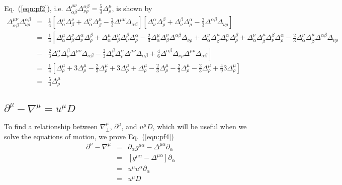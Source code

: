 \documentclass[aps,article]{revtex4}
\begin{document}
Eq.\ (\ref{eqn:pf2}), i.e. $\Delta^{\mu\nu}_{\alpha\beta}\Delta_{\nu\rho}^{\alpha\beta}=\frac{5}{3}\Delta^{\mu}_{\rho}$, is shown by
\begin{eqnarray}
\Delta^{\mu\nu}_{\alpha\beta}\Delta_{\nu\rho}^{\alpha\beta}&=&\frac{1}{4}\left[\Delta_{\alpha}^{\mu}\Delta_{\beta}^{\nu}+\Delta_{\alpha}^{\nu}\Delta_{\beta}^{\mu}-\frac{2}{3}\Delta^{\mu\nu}\Delta_{\alpha\beta}\right]\left[\Delta^{\alpha}_{\nu}\Delta^{\beta}_{\rho}+\Delta^{\beta}_{\nu}\Delta^{\alpha}_{\rho}-\frac{2}{3}\Delta^{\alpha\beta}\Delta_{\nu\rho}\right]\nonumber\\
&=&\frac{1}{4}\left[\Delta_{\alpha}^{\mu}\Delta_{\beta}^{\nu}\Delta^{\alpha}_{\nu}\Delta^{\beta}_{\rho}+\Delta_{\alpha}^{\mu}\Delta_{\beta}^{\nu}\Delta^{\beta}_{\nu}\Delta^{\alpha}_{\rho}-\frac{2}{3}\Delta_{\alpha}^{\mu}\Delta_{\beta}^{\nu}\Delta^{\alpha\beta}\Delta_{\nu\rho}+\Delta_{\alpha}^{\nu}\Delta_{\beta}^{\mu}\Delta^{\alpha}_{\nu}\Delta^{\beta}_{\rho}+\Delta_{\alpha}^{\nu}\Delta_{\beta}^{\mu}\Delta^{\beta}_{\nu}\Delta^{\alpha}_{\rho}-\frac{2}{3}\Delta_{\alpha}^{\nu}\Delta_{\beta}^{\mu}\Delta^{\alpha\beta}\Delta_{\nu\rho}\right.\nonumber\\
&-&\left.\frac{2}{3}\Delta^{\alpha}_{\nu}\Delta^{\beta}_{\rho}\Delta^{\mu\nu}\Delta_{\alpha\beta}-\frac{2}{3}\Delta^{\beta}_{\nu}\Delta^{\alpha}_{\rho}\Delta^{\mu\nu}\Delta_{\alpha\beta}+\frac{4}{6}\Delta^{\alpha\beta}\Delta_{\nu\rho}\Delta^{\mu\nu}\Delta_{\alpha\beta}\right]\nonumber\\
&=&\frac{1}{4}\left[\Delta^{\mu}_{\rho}+3\Delta^{\mu}_{\rho}-\frac{2}{3}\Delta^{\mu}_{\rho}+3\Delta^{\mu}_{\rho}+\Delta^{\mu}_{\rho}-\frac{2}{3}\Delta_{\rho}^{\mu}-\frac{2}{3}\Delta^{\mu}_{\rho}-\frac{2}{3}\Delta^{\mu}_{\rho}+\frac{4}{9}3\Delta_{\rho}^{\mu}\right]\nonumber\\
&=&\frac{5}{3}\Delta_{\rho}^{\mu}
\end{eqnarray}

\subsection{$\partial^{\mu}-\nabla^{\mu}=u^{\mu}D$}

To find a relationship between $\nabla_{\perp}^{\mu}$, $\partial^{\mu}$, and $u^{\mu}D$, which will be useful when we solve the equations of motion, we prove Eq.\ (\ref{eqn:pf4})
\begin{eqnarray}
\partial^{\mu}-\nabla^{\mu}&=&\partial_{\alpha}g^{\mu\alpha}-\Delta^{\mu\alpha}\partial_{\alpha}\nonumber\\
&=&\left[g^{\mu\alpha}-\Delta^{\mu\alpha}\right]\partial_{\alpha}\nonumber\\
&=&u^{\mu}u^{\alpha}\partial_{\alpha}\nonumber\\
&=&u^{\mu}D
\end{eqnarray}
\end{document}
